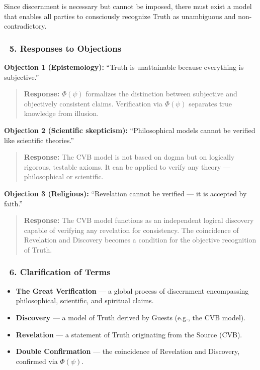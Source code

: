 \documentclass[12pt]{article}
\begin{document}
Since discernment is necessary but cannot be imposed, there must exist a model that enables all parties to consciously recognize Truth as unambiguous and non-contradictory.

\subsubsection*{🔹 5. Responses to Objections}

\textbf{Objection 1 (Epistemology):}
``Truth is unattainable because everything is subjective.''

\begin{quote}
\textbf{Response:} 
$\Phi(\psi)$ formalizes the distinction between subjective and objectively consistent claims. Verification via $\Phi(\psi)$ separates true knowledge from illusion.
\end{quote}

\textbf{Objection 2 (Scientific skepticism):}
``Philosophical models cannot be verified like scientific theories.''

\begin{quote}
\textbf{Response:} 
The CVB model is not based on dogma but on logically rigorous, testable axioms. It can be applied to verify any theory — philosophical or scientific.
\end{quote}

\textbf{Objection 3 (Religious):}
``Revelation cannot be verified — it is accepted by faith.''

\begin{quote}
\textbf{Response:} 
The CVB model functions as an independent logical discovery capable of verifying any revelation for consistency. The coincidence of Revelation and Discovery becomes a condition for the objective recognition of Truth.
\end{quote}

\subsubsection*{🔹 6. Clarification of Terms}

\begin{itemize}
\item \textbf{The Great Verification} — a global process of discernment encompassing philosophical, scientific, and spiritual claims.
\item \textbf{Discovery} — a model of Truth derived by Guests (e.g., the CVB model).
\item \textbf{Revelation} — a statement of Truth originating from the Source (CVB).
\item \textbf{Double Confirmation} — the coincidence of Revelation and Discovery, confirmed via $\Phi(\psi)$.
\end{itemize}
\end{document}
